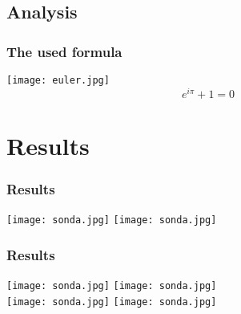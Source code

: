 \documentclass{beamer} %
\begin{document}
\subsection{Analysis}

\begin{frame}
\frametitle{The used formula}

\centering %
\texttt{[image: euler.jpg]} \\

\begin{equation}
e^{i \pi} + 1 = 0
\end{equation}
\end{frame}

\section{Results}

\begin{frame}
\frametitle{Results}
\centering
\texttt{[image: sonda.jpg]} %
\texttt{[image: sonda.jpg]}
\end{frame}

\begin{frame}
\frametitle{Results}
\centering
\texttt{[image: sonda.jpg]} %
\texttt{[image: sonda.jpg]} \\ %
\smallskip %
\texttt{[image: sonda.jpg]}
\texttt{[image: sonda.jpg]}
\end{frame}
\end{document}
